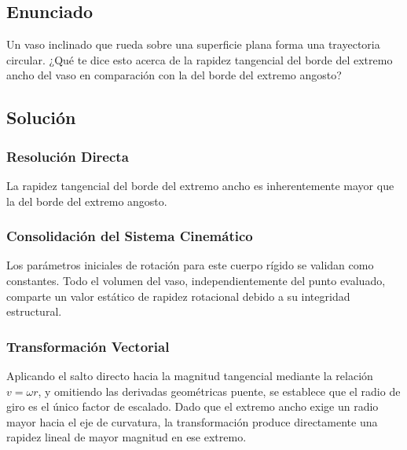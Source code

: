 \documentclass{article}
\begin{document}
\newpage

\subsection*{Enunciado}
Un vaso inclinado que rueda sobre una superficie plana forma una trayectoria circular. ¿Qué te dice esto acerca de la rapidez tangencial del borde del extremo ancho del vaso en comparación con la del borde del extremo angosto?

\subsection*{Solución}

\subsubsection*{Resolución Directa}
La rapidez tangencial del borde del extremo ancho es inherentemente mayor que la del borde del extremo angosto.

\subsubsection*{Consolidación del Sistema Cinemático}
Los parámetros iniciales de rotación para este cuerpo rígido se validan como constantes. Todo el volumen del vaso, independientemente del punto evaluado, comparte un valor estático de rapidez rotacional debido a su integridad estructural. 

\subsubsection*{Transformación Vectorial}
Aplicando el salto directo hacia la magnitud tangencial mediante la relación $v = \omega r$, y omitiendo las derivadas geométricas puente, se establece que el radio de giro es el único factor de escalado. Dado que el extremo ancho exige un radio mayor hacia el eje de curvatura, la transformación produce directamente una rapidez lineal de mayor magnitud en ese extremo.
\end{document}
